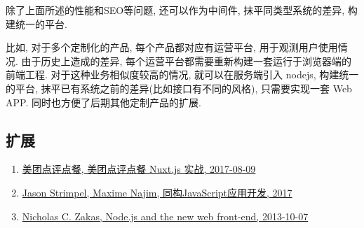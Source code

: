除了上面所述的性能和SEO等问题, 还可以作为中间件, 抹平同类型系统的差异,
构建统一的平台.

比如, 对于多个定制化的产品, 每个产品都对应有运营平台,
用于观测用户使用情况. 由于历史上造成的差异,
每个运营平台都需要重新构建一套运行于浏览器端的前端工程.
对于这种业务相似度较高的情况, 就可以在服务端引入 nodejs, 构建统一的平台,
抹平已有系统之前的差异(比如接口有不同的风格), 只需要实现一套 Web APP.
同时也方便了后期其他定制产品的扩展.

\subsection{扩展}\label{ux6269ux5c55}

\begin{enumerate}
\def\labelenumi{\arabic{enumi}.}
\tightlist
\item
  \href{https://juejin.im/post/598aabe96fb9a03c335a8dde}{美团点评点餐,
  美团点评点餐 Nuxt.js 实战, 2017-08-09}
\item
  \href{https://book.douban.com/subject/27183584/}{Jason Strimpel,
  Maxime Najim, 同构JavaScript应用开发, 2017}
\item
  \href{https://www.nczonline.net/blog/2013/10/07/node-js-and-the-new-web-front-end/}{Nicholas
  C. Zakas, Node.js and the new web front-end, 2013-10-07}
\end{enumerate}
